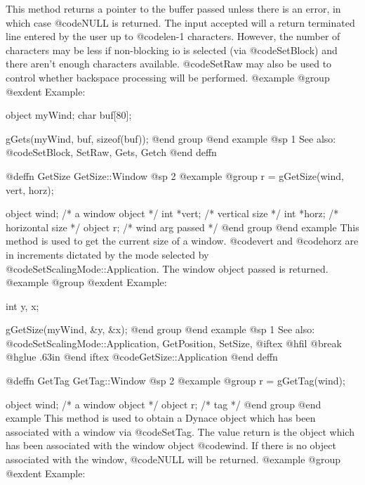 This method returns a pointer to the buffer passed unless there is an
error, in which case @code{NULL} is returned.
The input accepted will a return terminated line entered by the user
up to @code{len}-1 characters.  However, the number of characters
may be less if non-blocking
io is selected (via @code{SetBlock}) and there aren't enough characters
available.  @code{SetRaw} may also be used to control whether backspace
processing will be performed.
@example
@group
@exdent Example:

object  myWind;
char    buf[80];

gGets(myWind, buf, sizeof(buf));
@end group
@end example
@sp 1
See also:  @code{SetBlock, SetRaw, Gets, Getch}
@end deffn












@deffn {GetSize} GetSize::Window
@sp 2
@example
@group
r = gGetSize(wind, vert, horz);

object  wind;   /*  a window object     */
int    *vert;   /*  vertical size       */
int    *horz;   /*  horizontal size     */
object  r;      /*  wind arg passed     */
@end group
@end example
This method is used to get the current size of a window.
@code{vert} and @code{horz} are in increments dictated by the
mode selected by @code{SetScalingMode::Application}.  The window
object passed is returned.
@example
@group
@exdent Example:

int     y, x;

gGetSize(myWind, &y, &x);
@end group
@end example
@sp 1
See also:  @code{SetScalingMode::Application, GetPosition, SetSize,}
@iftex
@hfil @break @hglue .63in 
@end iftex
@code{GetSize::Application}
@end deffn










@deffn {GetTag} GetTag::Window
@sp 2
@example
@group
r = gGetTag(wind);

object  wind;   /*  a window object   */
object  r;      /*  tag               */
@end group
@end example
This method is used to obtain a Dynace object which has been associated
with a window via @code{SetTag}.  The value return is the object which has
been associated with the window object @code{wind}.  If there is no object
associated with the window, @code{NULL} will be returned.
@example
@group
@exdent Example:

